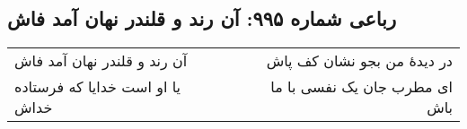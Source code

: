 \begin{center}
\section*{رباعی شماره ۹۹۵: آن رند و قلندر نهان آمد فاش}
\label{sec:0995}
\begin{longtable}{l p{0.5cm} r}
آن رند و قلندر نهان آمد فاش
&&
در دیدهٔ من بجو نشان کف پاش
\\
یا او است خدایا که فرستاده خداش
&&
ای مطرب جان یک نفسی با ما باش
\\
\end{longtable}
\end{center}
